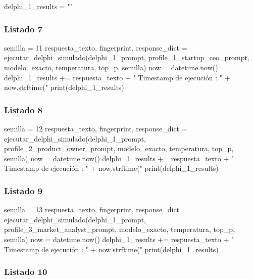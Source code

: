 \begin{APACode}
delphi_1_results = ""
\end{APACode}

\subsubsection{Listado 7}
\label{anexo:code-6-3-1-1-7}

\begin{APACode}
semilla = 11
respuesta_texto, fingerprint, response_dict = ejecutar_delphi_simulado(delphi_1_prompt, profile_1_startup_ceo_prompt, modelo_exacto, temperatura, top_p, semilla)
now = datetime.now()
delphi_1_results += respuesta_texto + " \n Timestamp de ejecución : " + now.strftime("%
print(delphi_1_results)
\end{APACode}

\subsubsection{Listado 8}
\label{anexo:code-6-3-1-1-8}

\begin{APACode}
semilla = 12
respuesta_texto, fingerprint, response_dict = ejecutar_delphi_simulado(delphi_1_prompt, profile_2_product_owner_prompt, modelo_exacto, temperatura, top_p, semilla)
now = datetime.now()
delphi_1_results += respuesta_texto + " \n Timestamp de ejecución : " + now.strftime("%
print(delphi_1_results)
\end{APACode}

\subsubsection{Listado 9}
\label{anexo:code-6-3-1-1-9}

\begin{APACode}
semilla = 13
respuesta_texto, fingerprint, response_dict = ejecutar_delphi_simulado(delphi_1_prompt, profile_3_market_analyst_prompt, modelo_exacto, temperatura, top_p, semilla)
now = datetime.now()
delphi_1_results += respuesta_texto + " \n Timestamp de ejecución : " + now.strftime("%
print(delphi_1_results)
\end{APACode}

\subsubsection{Listado 10}
\label{anexo:code-6-3-1-1-10}

